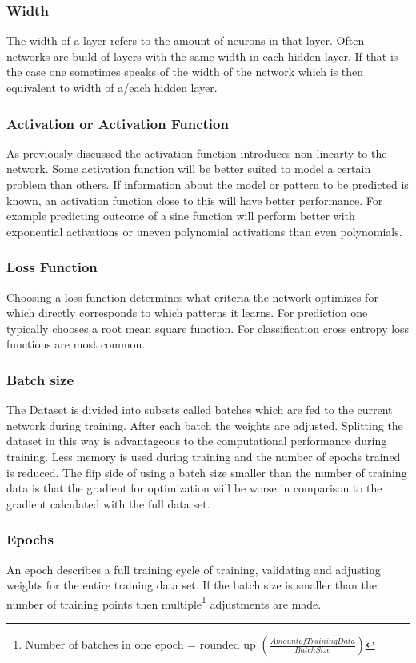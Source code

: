 			\subsubsection{Width}
				The width of a layer refers to the amount of neurons in that layer. Often networks are build of layers with the same width in each hidden layer. If that is the case one sometimes speaks of the width of the network which is then equivalent to width of a/each hidden layer.
			\subsubsection{Activation or Activation Function}
				As previously discussed the activation function introduces non-linearty to the network. Some activation function will be better suited to model a certain problem than others. If information about the model or pattern to be predicted is known, an activation function close to this will have better performance. For example predicting outcome of a sine function will perform better with exponential activations or uneven polynomial activations than even polynomials.%
			\subsubsection{Loss Function}
				Choosing a loss function determines what criteria the network optimizes for which directly corresponds to which patterns it learns. For prediction one typically chooses a root mean square function. For classification cross entropy loss functions are most common.
			\subsubsection{Batch size}
				The Dataset is divided into subsets called batches which are fed to the current network during training. After each batch the weights are adjusted. Splitting the dataset in this way is advantageous to the computational performance during training. Less memory is used during training and the number of epochs trained is reduced. The flip side of using a batch size smaller than the number of training data is that the gradient for optimization will be worse in comparison to the gradient calculated with the full data set. 
			\subsubsection{Epochs}
				An epoch describes a full training cycle of training, validating and adjusting weights for the entire training data set. If the batch size is smaller than the number of training points then multiple\footnote{Number of batches in one epoch = rounded up $\left(\frac{Amount of Training Data}{Batch Size}\right)$} adjustments are made.%

